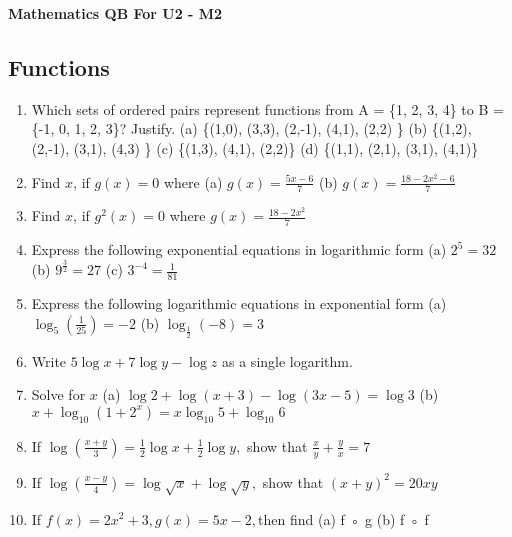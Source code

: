 \documentclass[14pt]{article}
\begin{document}
\centering 
{\huge \bf Mathematics QB For U2 - M2\par}
\vspace{1cm}
\begin{multicols}{2}

\section{Functions}
\noindent
\begin{enumerate}[resume]


 \item  Which sets of ordered pairs represent
functions from A = \{1, 2, 3, 4\} to B = \{-1, 0,
1, 2, 3\}? Justify. 
	 (a)	 \{(1,0), (3,3), (2,-1), (4,1), (2,2) \}    
	 (b) 	\{(1,2), (2,-1), (3,1), (4,3) \}   	 (c) 	\{(1,3), (4,1), (2,2)\}	 (d) 	\{(1,1), (2,1), (3,1), (4,1)\}
 
 \item Find $x$, if $g (x) = 0$ where  (a) $g(x)=\frac{5x-6}{7}$ (b) $g(x)=\frac{18-2x^2-6}{7}$ 
 
 \item Find $x$, if $g^2 (x) = 0$ where  $g(x)=\frac{18-2x^2}{7}$ 
 

\item Express the following exponential equations
in logarithmic form  (a) $2^5=32$ (b) $9^\frac{3}{2}=27$ (c) $3^{-4} = \frac{1}{81}$

\item Express the following logarithmic equations 	
in exponential form (a) $\log_5\left( \frac{1}{25}\right)=-2$ (b) $\log_\frac{1}{2}(-8)=3$ 

\item Write $5\log x + 7\log y -\log z$ as a single
logarithm.

\item Solve for $x$ (a) $\log2 +\log(x+3) -\log(3x-5) =\log3$ (b) $x +\log_{10} (1+2^x ) = x\log_{10} 5 +\log_{ 10}6$

\item If  $\log\left(\frac{x+y}{3}\right)=\frac{1}{2}\log x+ \frac{1}{2}\log y, $ show that $\frac{x}{y}+\frac{y}{x}=7$

\item If  $\log\left(\frac{x-y}{4}\right)= \log \sqrt{x}+ \log \sqrt{y}, $ show that $(x+y)^2=20xy$

\item If  $f (x) = 2x^2 + 3, g (x) = 5x - 2, $then find
	(a) f ◦ g
	(b) f ◦ f	


\end{enumerate}
\end{multicols}
\end{document}
